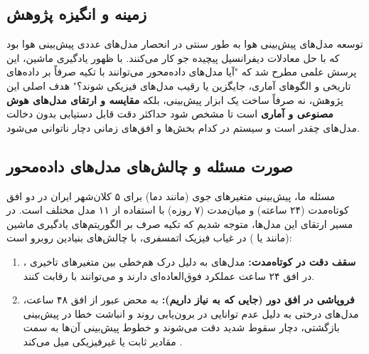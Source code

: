 \documentclass[12pt, a4paper]{article}
\newcommand{\code}[1]{\lr{\texttt{#1}}}
\begin{document}
	\subsection{زمینه و انگیزه پژوهش}
	توسعه مدل‌های پیش‌بینی هوا به طور سنتی در انحصار مدل‌های عددی پیش‌بینی هوا  بود که با حل معادلات دیفرانسیل پیچیده جو کار می‌کنند. با ظهور یادگیری ماشین، این پرسش علمی مطرح شد که "آیا مدل‌های داده‌محور  می‌توانند با تکیه صرفاً بر داده‌های تاریخی و الگوهای آماری، جایگزین یا رقیب مدل‌های فیزیکی شوند؟"
	هدف اصلی این پژوهش، نه صرفاً ساخت یک ابزار پیش‌بینی، بلکه \textbf{مقایسه و ارتقای مدل‌های هوش مصنوعی و آماری} است تا مشخص شود حداکثر دقت قابل دستیابی بدون دخالت مدل‌های  چقدر است و سیستم در کدام بخش‌ها و افق‌های زمانی دچار ناتوانی می‌شود.
	
	\subsection{صورت مسئله و چالش‌های مدل‌های داده‌محور}
	مسئله ما، پیش‌بینی متغیرهای جوی (مانند دما) برای ۵ کلان‌شهر ایران در دو افق کوتاه‌مدت (۲۴ ساعته) و میان‌مدت (۷ روزه) با استفاده از ۱۱ مدل مختلف است.
	در مسیر ارتقای این مدل‌ها، متوجه شدیم که تکیه صرف بر الگوریتم‌های یادگیری ماشین (مانند \code{XGBoost} یا \code{LightGBM}) در غیاب فیزیک اتمسفری، با چالش‌های بنیادین روبرو است:
	
	\begin{enumerate}[label=\arabic*.]
		\item \textbf{سقف دقت در کوتاه‌مدت:} مدل‌های  به دلیل درک هم‌خطی بین متغیرهای تاخیری ، در افق ۲۴ ساعت عملکرد فوق‌العاده‌ای دارند و می‌توانند با  رقابت کنند.
		\item \textbf{فروپاشی در افق دور (جایی که به  نیاز داریم):} به محض عبور از افق ۴۸ ساعت، مدل‌های درختی به دلیل عدم توانایی در برون‌یابی روند  و انباشت خطا در پیش‌بینی بازگشتی، دچار سقوط شدید دقت می‌شوند و خطوط پیش‌بینی آن‌ها به سمت مقادیر ثابت یا غیرفیزیکی میل می‌کند .
	\end{enumerate}
	
\end{document}
